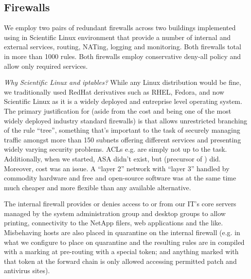 \subsection{Firewalls}
\label{sect:firewalls}

We employ two pairs of redundant firewalls across two buildings
implemented using  in Scientific Linux environment
\cite{linux-firewalls-ids-2007,linux-iptables-pocket-2004,linux-firewalls-2006}
that provide a number of internal and external services, routing, NATing, logging
and monitoring. Both firewalls total in more than 1000 rules. Both firewalls
employ conservative deny-all policy and allow only required services.

{\em Why Scientific Linux and iptables?}
While any Linux distribution would be fine, we traditionally used RedHat derivatives
such as RHEL, Fedora, and now Scientific Linux as it is a widely deployed and entreprise level
operating system. The primary justification for 
(aside from the cost and being one of the most widely deployed industry standard firewalls) is that
 allows unrestricted branching of the rule ``tree'', something that's important to the
task of securely managing traffic amongst more than 150 subnets
offering different services and presenting widely varying
security problems. {\cisco} ACLs e.g. are simply not up to the task.
Additionally, when we started, {\cisco} ASA didn't exist, but  (precursor of )
did. Moreover, cost was an issue.  A ``layer 2'' {\cisco} network
with ``layer 3'' handled by commodity hardware and free and open-source software
was at the same time much cheaper and more flexible than any available
alternative.

The internal firewall provides or denies access to or from our IT's
core servers managed by the system administration group and desktop groups
to allow printing, connectivity to the NetApp filers, web applications and
the like. Misbehaving hosts are also placed in quarantine on the internal
firewall
(e.g. in 
what we configure to
place on quarantine and the resulting  rules are
in  compiled with a 
\cite{gmake}
marking at pre-routing with a special token; and anything marked with that token
at the forward chain is only allowed accessing permitted patch and antivirus sites).

